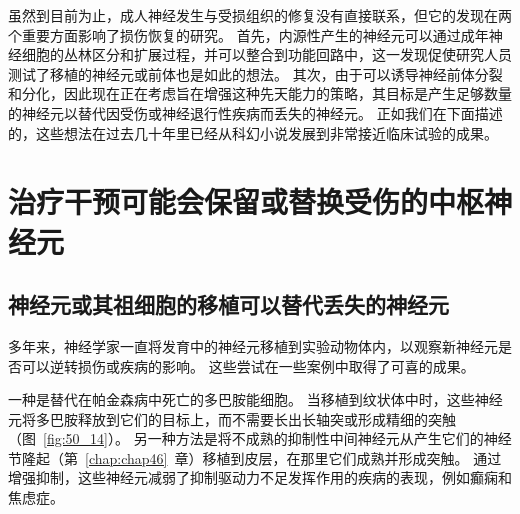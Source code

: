 虽然到目前为止，成人神经发生与受损组织的修复没有直接联系，但它的发现在两个重要方面影响了损伤恢复的研究。
首先，内源性产生的神经元可以通过成年神经细胞的丛林区分和扩展过程，并可以整合到功能回路中，这一发现促使研究人员测试了移植的神经元或前体也是如此的想法。
其次，由于可以诱导神经前体分裂和分化，因此现在正在考虑旨在增强这种先天能力的策略，其目标是产生足够数量的神经元以替代因受伤或神经退行性疾病而丢失的神经元。
正如我们在下面描述的，这些想法在过去几十年里已经从科幻小说发展到非常接近临床试验的成果。



\section{治疗干预可能会保留或替换受伤的中枢神经元}

\subsection{神经元或其祖细胞的移植可以替代丢失的神经元}

多年来，神经学家一直将发育中的神经元移植到实验动物体内，以观察新神经元是否可以逆转损伤或疾病的影响。
这些尝试在一些案例中取得了可喜的成果。


一种是替代在帕金森病中死亡的多巴胺能细胞。
当移植到纹状体中时，这些神经元将多巴胺释放到它们的目标上，而不需要长出长轴突或形成精细的突触（图~\ref{fig:50_14}）。
另一种方法是将不成熟的抑制性中间神经元从产生它们的神经节隆起（第~\ref{chap:chap46}~章）移植到皮层，在那里它们成熟并形成突触。
通过增强抑制，这些神经元减弱了抑制驱动力不足发挥作用的疾病的表现，例如癫痫和焦虑症。


